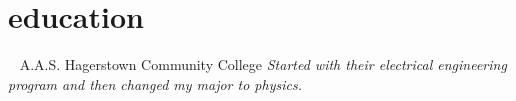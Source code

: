 \section{education}

\begin{entrylist}
  \entry
    {~}
    {A.A.S. }
    {Hagerstown Community College}
    {\emph{Started with their electrical engineering program and then changed my major to physics.}}
\end{entrylist}
